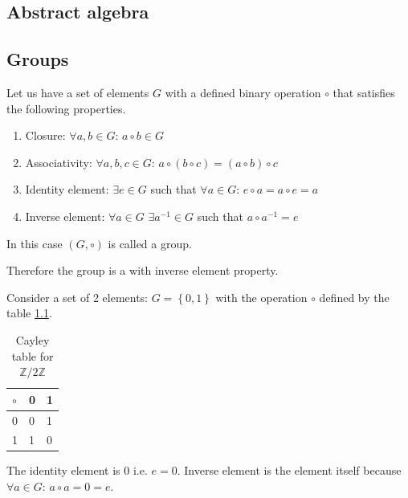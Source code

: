 \begin{appendices}

\chapter{Abstract algebra}

\label{sec:abstractalgebra}

\section{Groups}

\begin{definition}[Group]
  \label{def:group}
  Let us have a set of elements $G$ with a defined binary operation
  $\circ$ that satisfies the following properties.
  \begin{enumerate}
  \item Closure: $\forall a, b \in G$: $a \circ b \in G$
  \item Associativity: $\forall a, b, c \in G$:
    $a \circ \left( b \circ c \right) =
    \left( a \circ b \right) \circ c$
  \item Identity element: $\exists e \in G$ such that
    $\forall a \in G$: $e \circ a = a \circ e = a$
  \item Inverse element: $\forall a \in G$ $\exists a^{-1} \in G$ such that
    $a \circ a^{-1} = e$
  \end{enumerate}
  In this case $\left(G, \circ\right)$ is called a group.
\end{definition}
Therefore the group is a  with inverse element
property. 

\begin{example}
  Consider a set of 2 elements: $G = \left\{0, 1\right\}$ with the
  operation $\circ$ defined by the table \ref{tab:CayleyZ2Z}.
  \begin{table}
    \centering
    \caption{Cayley table for $\mathbb{Z}/2\mathbb{Z}$}
    \label{tab:CayleyZ2Z}
    \begin{tabular}{l|ll}
      \toprule
      $\circ$ & 0 & 1 \\
      \midrule
      0 & 0 & 1 \\
      1 & 1 & 0 \\
      \bottomrule
    \end{tabular}
  \end{table}

  The identity element is $0$ i.e. $e = 0$.
  Inverse element is the element itself
  because $\forall a \in G$: $a \circ a = 0 = e$.
  \label{ex:groupZ2}
\end{example}


\end{appendices}

